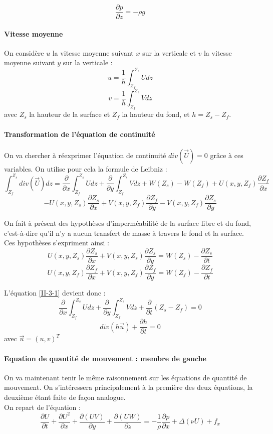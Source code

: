 	\[\frac{\partial p}{\partial z}=-\rho g\]

	\paragraph{Vitesse moyenne}
On considère $u$ la vitesse moyenne suivant $x$ sur la verticale et $v$ la vitesse moyenne suivant $y$ sur la verticale :
	\[u=\frac{1}{h} \int_{Z_f}^{Z_s} U dz\]
	\[v=\frac{1}{h} \int_{Z_f}^{Z_s} V dz\]
avec $Z_s$ la hauteur de la surface et $Z_f$ la hauteur du fond, et $h=Z_s-Z_f$.

	\paragraph{Transformation de l'équation de continuité}
On va chercher à réexprimer l'équation de continuité $div(\overrightarrow{U})=0$ grâce à ces variables. On utilise pour cela la formule de Leibniz :
\begin{equation} \label{II-3-1}\int_{Z_f}^{Z_s} div(\overrightarrow{U}) dz = \frac{\partial}{\partial x} \int_{Z_f}^{Z_s} Udz + \frac{\partial}{\partial y} \int_{Z_f}^{Z_s} V dz + W(Z_s)-W(Z_f) + U(x,y,Z_f)\frac{\partial Z_f}{\partial x}\end{equation}
\[- U(x,y,Z_s)\frac{\partial Z_s}{\partial x} + V(x,y,Z_f)\frac{\partial Z_f}{\partial y} - V(x,y,Z_f)\frac{\partial Z_s}{\partial y}\]

On fait à présent des hypothèses d'imperméabilité de la surface libre et du fond, c'est-à-dire qu'il n'y a aucun transfert de masse à travers le fond et la surface. Ces hypothèses s'expriment ainsi :
\[U(x,y,Z_s)\frac{\partial Z_s}{\partial x} + V(x,y,Z_s)\frac{\partial Z_s}{\partial y}=W(Z_s)-\frac{\partial Z_s}{\partial t}\]
\[U(x,y,Z_f)\frac{\partial Z_f}{\partial x} + V(x,y,Z_f)\frac{\partial Z_f}{\partial y}=W(Z_f)-\frac{\partial Z_f}{\partial t}\]

L'équation \ref{II-3-1} devient donc :
\[\frac{\partial}{\partial x} \int_{Z_f}^{Z_s} U dz + \frac{\partial}{\partial y} \int_{Z_f}^{Z_s} V dz + \frac{\partial}{\partial t} (Z_s-Z_f)=0\]
\begin{equation}\label{II-3-2} div(h\overrightarrow{u}) + \frac{\partial h}{\partial t} = 0 \end{equation}
avec $\overrightarrow{u}=(u,v)^T$

\paragraph{Equation de quantité de mouvement : membre de gauche}
On va maintenant tenir le même raisonnement sur les équations de quantité de mouvement. On s'intéressera principalement à la première des deux équations, la deuxième étant faite de façon analogue.\\
On repart de l'équation :
\[\frac{\partial U}{\partial t} + \frac{\partial U^2}{\partial x} + \frac{\partial (UV)}{\partial y} +\frac{\partial (UW)}{\partial z} = -\frac{1}{\rho}\frac{\partial p}{\partial x} + \Delta(\nu U)+f_x\]

